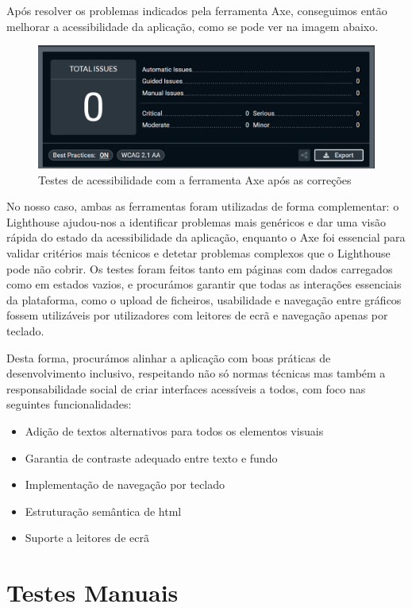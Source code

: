 Após resolver os problemas indicados pela ferramenta Axe, conseguimos então melhorar a acessibilidade da aplicação, como se pode ver na imagem abaixo.

\begin{figure}[H]
\centering
\includegraphics[width=\textwidth]{./img/axe_after}
\caption{Testes de acessibilidade com a ferramenta Axe após as correções}
\end{figure}

No nosso caso, ambas as ferramentas foram utilizadas de forma complementar: o Lighthouse ajudou-nos a identificar problemas mais genéricos e dar uma visão rápida do estado da acessibilidade da aplicação, enquanto o Axe foi essencial para validar critérios mais técnicos e detetar problemas complexos que o Lighthouse pode não cobrir. Os testes foram feitos tanto em páginas com dados carregados como em estados vazios, e procurámos garantir que todas as interações essenciais da plataforma,  como o upload de ficheiros, usabilidade e navegação entre gráficos fossem utilizáveis por utilizadores com leitores de ecrã e navegação apenas por teclado.

Desta forma, procurámos alinhar a aplicação com boas práticas de desenvolvimento inclusivo, respeitando não só normas técnicas mas também a responsabilidade social de criar interfaces acessíveis a todos, com foco nas seguintes funcionalidades:
\begin{itemize}
    \item Adição de textos alternativos para todos os elementos visuais
    \item Garantia de contraste adequado entre texto e fundo
    \item Implementação de navegação por teclado
    \item Estruturação semântica de \gls{html}
    \item Suporte a leitores de ecrã
\end{itemize}

\section{Testes Manuais}

